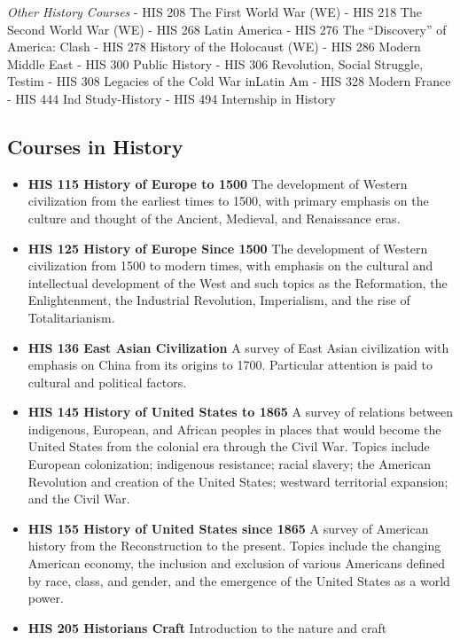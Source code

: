 \documentclass[
  letterpaper,
]{scrbook}
\providecommand{\tightlist}{%
  \setlength{\itemsep}{0pt}\setlength{\parskip}{0pt}}
\begin{document}
\emph{Other History Courses} - HIS 208 The First World War (WE) - HIS
218 The Second World War (WE) - HIS 268 Latin America - HIS 276 The
``Discovery'' of America: Clash - HIS 278 History of the Holocaust (WE)
- HIS 286 Modern Middle East - HIS 300 Public History - HIS 306
Revolution, Social Struggle, Testim - HIS 308 Legacies of the Cold War
inLatin Am - HIS 328 Modern France - HIS 444 Ind Study-History - HIS 494
Internship in History

\subsection{Courses in History}\label{courses-in-history}

\begin{itemize}
\tightlist
\item
  \textbf{HIS 115 History of Europe to 1500} The development of Western
  civilization from the earliest times to 1500, with primary emphasis on
  the culture and thought of the Ancient, Medieval, and Renaissance
  eras.
\item
  \textbf{HIS 125 History of Europe Since 1500} The development of
  Western civilization from 1500 to modern times, with emphasis on the
  cultural and intellectual development of the West and such topics as
  the Reformation, the Enlightenment, the Industrial Revolution,
  Imperialism, and the rise of Totalitarianism.
\item
  \textbf{HIS 136 East Asian Civilization} A survey of East Asian
  civilization with emphasis on China from its origins to 1700.
  Particular attention is paid to cultural and political factors.
\item
  \textbf{HIS 145 History of United States to 1865} A survey of
  relations between indigenous, European, and African peoples in places
  that would become the United States from the colonial era through the
  Civil War. Topics include European colonization; indigenous
  resistance; racial slavery; the American Revolution and creation of
  the United States; westward territorial expansion; and the Civil War.
\item
  \textbf{HIS 155 History of United States since 1865} A survey of
  American history from the Reconstruction to the present. Topics
  include the changing American economy, the inclusion and exclusion of
  various Americans defined by race, class, and gender, and the
  emergence of the United States as a world power.
\item
  \textbf{HIS 205 Historians Craft} Introduction to the nature and craft

\end{itemize}
\end{document}
